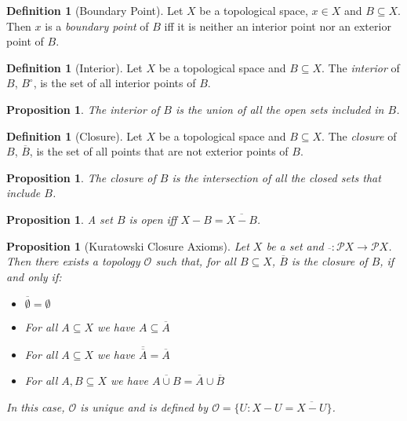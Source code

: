 \documentclass{book}
\newtheorem{prop}[ax]{Proposition}
\theoremstyle{definition}
\newtheorem{df}[ax]{Definition}
\begin{document}
\begin{df}[Boundary Point]
Let $X$ be a topological space, $x \in X$ and $B \subseteq X$. Then $x$ is a \emph{boundary point} of $B$ iff it is neither an interior point nor an exterior point of $B$.
\end{df}

\begin{df}[Interior]
Let $X$ be a topological space and $B \subseteq X$. The \emph{interior} of $B$, $B^\circ$, is the set of all interior points of $B$.
\end{df}

\begin{prop}
The interior of $B$ is the union of all the open sets included in $B$.
\end{prop}

\begin{df}[Closure]
Let $X$ be a topological space and $B \subseteq X$. The \emph{closure} of $B$, $\overline{B}$, is the set of all points that are not exterior points of $B$.
\end{df}

\begin{prop}
The closure of $B$ is the intersection of all the closed sets that include $B$.
\end{prop}

\begin{prop}
A set $B$ is open iff $X - B = \overline{X - B}$.
\end{prop}

\begin{prop}[Kuratowski Closure Axioms]
Let $X$ be a set and $\overline{\ } : \mathcal{P} X \rightarrow \mathcal{P} X$. Then there exists a topology $\mathcal{O}$ such that, for all $B \subseteq X$, $\overline{B}$ is the closure of $B$, if and only if:
\begin{itemize}
\item $\overline{\emptyset} = \emptyset$
\item For all $A \subseteq X$ we have $A \subseteq \overline{A}$
\item For all $A \subseteq X$ we have $\overline{\overline{A}} = \overline{A}$
\item For all $A, B \subseteq X$ we have $\overline{A \cup B} = \overline{A} \cup \overline{B}$
\end{itemize}
In this case, $\mathcal{O}$ is unique and is defined by $\mathcal{O} = \{ U : X - U = \overline{X - U} \}$.
\end{prop}
\end{document}
